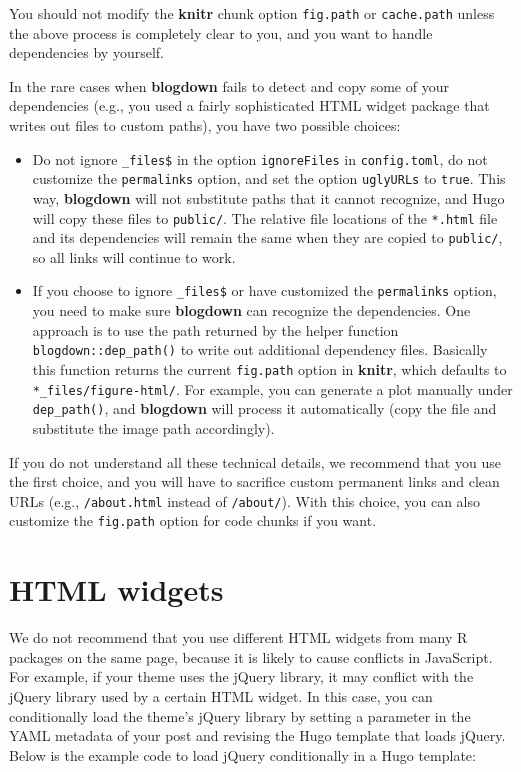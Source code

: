 \documentclass[12pt,]{krantz}
\theoremstyle{definition}
\theoremstyle{definition}
\theoremstyle{definition}
\theoremstyle{remark}
\begin{document}
You should not modify the \textbf{knitr} chunk option \texttt{fig.path}
or \texttt{cache.path} unless the above process is completely clear to
you, and you want to handle dependencies by yourself.

In the rare cases when \textbf{blogdown} fails to detect and copy some
of your dependencies (e.g., you used a fairly sophisticated HTML widget
package that writes out files to custom paths), you have two possible
choices:

\begin{itemize}
\item
  Do not ignore \texttt{\_files\$} in the option \texttt{ignoreFiles} in
  \texttt{config.toml}, do not customize the \texttt{permalinks} option,
  and set the option \texttt{uglyURLs} to \texttt{true}. This way,
  \textbf{blogdown} will not substitute paths that it cannot recognize,
  and Hugo will copy these files to \texttt{public/}. The relative file
  locations of the \texttt{*.html} file and its dependencies will remain
  the same when they are copied to \texttt{public/}, so all links will
  continue to work.
\item
  If you choose to ignore \texttt{\_files\$} or have customized the
  \texttt{permalinks} option, you need to make sure \textbf{blogdown}
  can recognize the dependencies. One approach is to use the path
  returned by the helper function \texttt{blogdown::dep\_path()} to
  write out additional dependency files. Basically this function returns
  the current \texttt{fig.path} option in \textbf{knitr}, which defaults
  to \texttt{*\_files/figure-html/}. For example, you can generate a
  plot manually under \texttt{dep\_path()}, and \textbf{blogdown} will
  process it automatically (copy the file and substitute the image path
  accordingly).
\end{itemize}

If you do not understand all these technical details, we recommend that
you use the first choice, and you will have to sacrifice custom
permanent links and clean URLs (e.g., \texttt{/about.html} instead of
\texttt{/about/}). With this choice, you can also customize the
\texttt{fig.path} option for code chunks if you want.

\hypertarget{html-widgets}{%
\section{HTML widgets}\label{html-widgets}}

We do not recommend that you use different HTML
widgets from many R packages on the same page,
because it is likely to cause conflicts in JavaScript. For example, if
your theme uses the jQuery library, it may conflict with the jQuery
library used by a certain HTML widget. In this case, you can
conditionally load the theme's jQuery library by setting a
parameter in the YAML metadata of your post and revising the Hugo
template that loads jQuery. Below is the example code to load jQuery
conditionally in a Hugo template:
\end{document}
